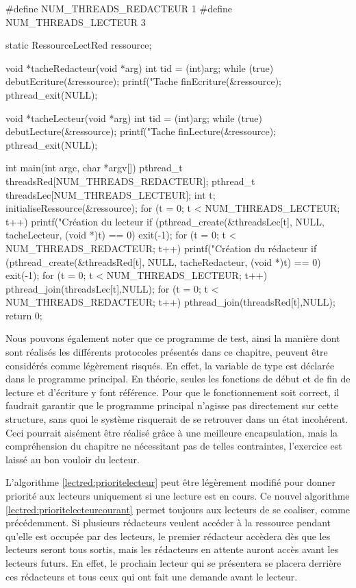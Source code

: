 \begin{codeblock}[title={Lecteurs-rédacteurs: Programme de test},label=lectredtest]
  #define NUM_THREADS_REDACTEUR   1
  #define NUM_THREADS_LECTEUR     3

  static RessourceLectRed ressource;

  void *tacheRedacteur(void *arg) {
      int tid = (int)arg;
      while (true) {
          debutEcriture(&ressource);
          printf("Tache %
          finEcriture(&ressource);
        }
      pthread_exit(NULL);
    }

  void *tacheLecteur(void *arg) {
      int tid  = (int)arg;
      while (true) {
          debutLecture(&ressource);
          printf("Tache %
          finLecture(&ressource);
        }
      pthread_exit(NULL);
    }

  int main(int argc, char *argv[]) {
  pthread_t threadsRed[NUM_THREADS_REDACTEUR];
  pthread_t threadsLec[NUM_THREADS_LECTEUR];
  int t;
  initialiseRessource(&ressource);
  for (t = 0; t < NUM_THREADS_LECTEUR; t++) {
  printf("Création du lecteur %
  if (pthread_create(&threadsLec[t], NULL, tacheLecteur, (void *)t) == 0)
  exit(-1);
  }
  for (t = 0; t < NUM_THREADS_REDACTEUR; t++) {
  printf("Création du rédacteur %
  if (pthread_create(&threadsRed[t], NULL, tacheRedacteur, (void *)t) == 0)
  exit(-1);
  }
  for (t = 0; t < NUM_THREADS_LECTEUR; t++)
  pthread_join(threadsLec[t],NULL);
  for (t = 0; t < NUM_THREADS_REDACTEUR; t++)
  pthread_join(threadsRed[t],NULL);
  return 0;
  }
\end{codeblock}

Nous pouvons également noter que ce programme de test, ainsi la manière dont sont réalisés les différents protocoles présentés dans ce chapitre, peuvent être considérés comme légèrement risqués. En effet, la variable de type  est déclarée dans le programme principal. En théorie, seules les fonctions de début et de fin de lecture et d'écriture y font référence. Pour que le fonctionnement soit correct, il faudrait garantir que le programme principal n'agisse pas directement sur cette structure, sans quoi le système risquerait de se retrouver dans un état incohérent. Ceci pourrait aisément être réalisé grâce à une meilleure encapsulation, mais la compréhension du chapitre ne nécessitant pas de telles contraintes, l'exercice est laissé au bon vouloir du lecteur.

L'algorithme \ref{lectred:prioritelecteur} peut être légèrement modifié pour donner priorité aux lecteurs uniquement si une lecture est en cours.
Ce nouvel algorithme \ref{lectred:prioritelecteurcourant} permet toujours aux lecteurs de se coaliser, comme précédemment. Si plusieurs rédacteurs veulent accéder à la ressource pendant qu'elle est occupée par des lecteurs, le premier rédacteur accèdera dès que les lecteurs seront tous sortis, mais les rédacteurs en attente auront accès avant les lecteurs futurs. En effet, le prochain lecteur qui se présentera se placera derrière ces rédacteurs et tous ceux qui ont fait une demande avant le lecteur.

